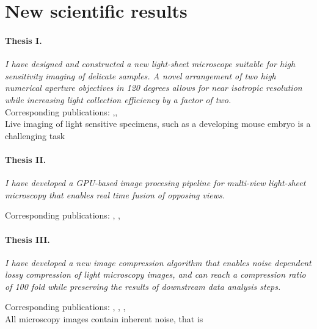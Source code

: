 \section{New scientific results}

  \paragraph{Thesis I.}\textit{I have designed and constructed a new light-sheet microscope suitable for high sensitivity imaging of delicate samples. A novel  arrangement of two high numerical aperture objectives in 120 degrees allows for near isotropic resolution while increasing light collection efficiency by a factor of two.}\\[0.5ex]
    Corresponding publications: \cite{de_medeiros_light-sheet_2016},\cite{strnad_inverted_2016}, \cite{hoyer_breaking_2016}\\[0.5ex]
    Live imaging of light sensitive specimens, such as a developing mouse embryo is a challenging task

  \paragraph{Thesis II.} \textit{I have developed a GPU-based image procesing pipeline for multi-view light-sheet microscopy that enables real time fusion of opposing views.}

    Corresponding publications: \cite{balazs_gpu-based_2016}, \cite{balazs_gpu-based_2016-1}, \cite{balazs_gpu-based_2017}



  \paragraph{Thesis III.} \textit{I have  developed a new image compression algorithm that enables noise dependent lossy compression of light microscopy images, and can reach a compression ratio of 100 fold while preserving the results of downstream data analysis steps.}

    Corresponding publications: \cite{balazs_real-time_2017}, \cite{balazs_gpu-based_2016}, \cite{balazs_gpu-based_2016-1}, \cite{balazs_gpu-based_2017}\\[1ex]
    \indent
    All microscopy images contain inherent noise, that is 


